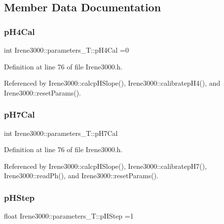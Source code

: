 \subsection{Member Data Documentation}
\mbox{\label{structIrene3000_1_1parameters__T_a1144de6fb54eb3e1dd2a3d8c2afc97dc}} 
\subsubsection{\texorpdfstring{p\+H4\+Cal}{pH4Cal}}
{\footnotesize\ttfamily int Irene3000\+::parameters\+\_\+\+T\+::p\+H4\+Cal =0}



Definition at line 76 of file Irene3000.\+h.



Referenced by Irene3000\+::calcp\+H\+Slope(), Irene3000\+::calibratep\+H4(), and Irene3000\+::reset\+Params().

\mbox{\label{structIrene3000_1_1parameters__T_a21265466a570d84bff914f26d2f7a03e}} 
\subsubsection{\texorpdfstring{p\+H7\+Cal}{pH7Cal}}
{\footnotesize\ttfamily int Irene3000\+::parameters\+\_\+\+T\+::p\+H7\+Cal}



Definition at line 76 of file Irene3000.\+h.



Referenced by Irene3000\+::calcp\+H\+Slope(), Irene3000\+::calibratep\+H7(), Irene3000\+::read\+Ph(), and Irene3000\+::reset\+Params().

\mbox{\label{structIrene3000_1_1parameters__T_a61cfcc2539d5f630e9071f3753aba9fe}} 
\subsubsection{\texorpdfstring{p\+H\+Step}{pHStep}}
{\footnotesize\ttfamily float Irene3000\+::parameters\+\_\+\+T\+::p\+H\+Step =1}



